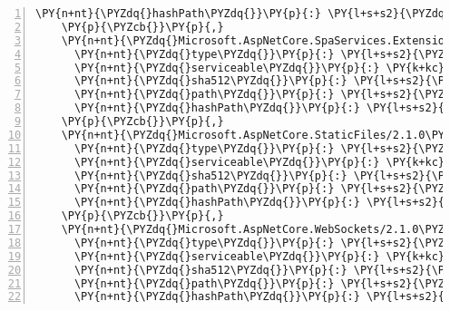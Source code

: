 \begin{Verbatim}[commandchars=\\\{\},numbers=left,firstnumber=1,stepnumber=1,numberblanklines=0]
      \PY{n+nt}{\PYZdq{}hashPath\PYZdq{}}\PY{p}{:} \PY{l+s+s2}{\PYZdq{}microsoft.aspnetcore.spaservices.2.1.0\PYZhy{}rc1\PYZhy{}final.nupkg.sha512\PYZdq{}}
    \PY{p}{\PYZcb{}}\PY{p}{,}
    \PY{n+nt}{\PYZdq{}Microsoft.AspNetCore.SpaServices.Extensions/2.1.0\PYZhy{}rc1\PYZhy{}final\PYZdq{}}\PY{p}{:} \PY{p}{\PYZob{}}
      \PY{n+nt}{\PYZdq{}type\PYZdq{}}\PY{p}{:} \PY{l+s+s2}{\PYZdq{}package\PYZdq{}}\PY{p}{,}
      \PY{n+nt}{\PYZdq{}serviceable\PYZdq{}}\PY{p}{:} \PY{k+kc}{true}\PY{p}{,}
      \PY{n+nt}{\PYZdq{}sha512\PYZdq{}}\PY{p}{:} \PY{l+s+s2}{\PYZdq{}sha512\PYZhy{}FkgqU8liyYXI0she2AIG8hf88w3tZOy3ykSLPwhq4HHkzTiBa6NbJV4TWtCDoP+VaaSh2bJNT4YOBESBl2OrAg==\PYZdq{}}\PY{p}{,}
      \PY{n+nt}{\PYZdq{}path\PYZdq{}}\PY{p}{:} \PY{l+s+s2}{\PYZdq{}microsoft.aspnetcore.spaservices.extensions/2.1.0\PYZhy{}rc1\PYZhy{}final\PYZdq{}}\PY{p}{,}
      \PY{n+nt}{\PYZdq{}hashPath\PYZdq{}}\PY{p}{:} \PY{l+s+s2}{\PYZdq{}microsoft.aspnetcore.spaservices.extensions.2.1.0\PYZhy{}rc1\PYZhy{}final.nupkg.sha512\PYZdq{}}
    \PY{p}{\PYZcb{}}\PY{p}{,}
    \PY{n+nt}{\PYZdq{}Microsoft.AspNetCore.StaticFiles/2.1.0\PYZhy{}rc1\PYZhy{}final\PYZdq{}}\PY{p}{:} \PY{p}{\PYZob{}}
      \PY{n+nt}{\PYZdq{}type\PYZdq{}}\PY{p}{:} \PY{l+s+s2}{\PYZdq{}package\PYZdq{}}\PY{p}{,}
      \PY{n+nt}{\PYZdq{}serviceable\PYZdq{}}\PY{p}{:} \PY{k+kc}{true}\PY{p}{,}
      \PY{n+nt}{\PYZdq{}sha512\PYZdq{}}\PY{p}{:} \PY{l+s+s2}{\PYZdq{}sha512\PYZhy{}Xy79eAEfbJI1eYi7TTTda4J/DsCqc17J0o85JJUE7CFybr0bTQL6+EvotQpH63UoOJrm81nLkn2HBWJ7oMhQqQ==\PYZdq{}}\PY{p}{,}
      \PY{n+nt}{\PYZdq{}path\PYZdq{}}\PY{p}{:} \PY{l+s+s2}{\PYZdq{}microsoft.aspnetcore.staticfiles/2.1.0\PYZhy{}rc1\PYZhy{}final\PYZdq{}}\PY{p}{,}
      \PY{n+nt}{\PYZdq{}hashPath\PYZdq{}}\PY{p}{:} \PY{l+s+s2}{\PYZdq{}microsoft.aspnetcore.staticfiles.2.1.0\PYZhy{}rc1\PYZhy{}final.nupkg.sha512\PYZdq{}}
    \PY{p}{\PYZcb{}}\PY{p}{,}
    \PY{n+nt}{\PYZdq{}Microsoft.AspNetCore.WebSockets/2.1.0\PYZhy{}rc1\PYZhy{}final\PYZdq{}}\PY{p}{:} \PY{p}{\PYZob{}}
      \PY{n+nt}{\PYZdq{}type\PYZdq{}}\PY{p}{:} \PY{l+s+s2}{\PYZdq{}package\PYZdq{}}\PY{p}{,}
      \PY{n+nt}{\PYZdq{}serviceable\PYZdq{}}\PY{p}{:} \PY{k+kc}{true}\PY{p}{,}
      \PY{n+nt}{\PYZdq{}sha512\PYZdq{}}\PY{p}{:} \PY{l+s+s2}{\PYZdq{}sha512\PYZhy{}aJtnWp7nrYeTjgT9b45p6gfHBe/Y+eHtsLem5qhCo3kpa8CcHm0fB4zAUHG57Op0TL184liFwsrDFSLvHAUTTw==\PYZdq{}}\PY{p}{,}
      \PY{n+nt}{\PYZdq{}path\PYZdq{}}\PY{p}{:} \PY{l+s+s2}{\PYZdq{}microsoft.aspnetcore.websockets/2.1.0\PYZhy{}rc1\PYZhy{}final\PYZdq{}}\PY{p}{,}
      \PY{n+nt}{\PYZdq{}hashPath\PYZdq{}}\PY{p}{:} \PY{l+s+s2}{\PYZdq{}microsoft.aspnetcore.websockets.2.1.0\PYZhy{}rc1\PYZhy{}final.nupkg.sha512\PYZdq{}}

\end{Verbatim}
